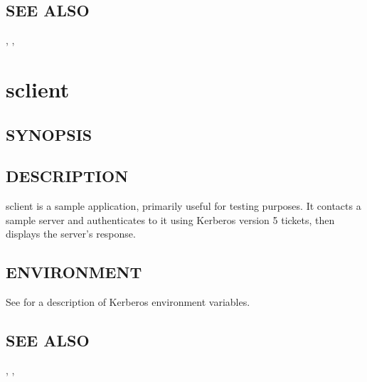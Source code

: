 \documentclass[letterpaper,10pt,english]{sphinxmanual}
\begin{document}
\subsection{SEE ALSO}
\label{\detokenize{user/user_commands/kvno:see-also}}
{\hyperref[\detokenize{user/user_commands/kinit:kinit-1}]{}}, {\hyperref[\detokenize{user/user_commands/kdestroy:kdestroy-1}]{}}, {\hyperref[\detokenize{user/user_config/kerberos:kerberos-7}]{}}


\section{sclient}
\label{\detokenize{user/user_commands/sclient:sclient}}\label{\detokenize{user/user_commands/sclient::doc}}\label{\detokenize{user/user_commands/sclient:sclient-1}}

\subsection{SYNOPSIS}
\label{\detokenize{user/user_commands/sclient:synopsis}}
 


\subsection{DESCRIPTION}
\label{\detokenize{user/user_commands/sclient:description}}
sclient is a sample application, primarily useful for testing
purposes.  It contacts a sample server  and
authenticates to it using Kerberos version 5 tickets, then displays
the server’s response.


\subsection{ENVIRONMENT}
\label{\detokenize{user/user_commands/sclient:environment}}
See {\hyperref[\detokenize{user/user_config/kerberos:kerberos-7}]{}} for a description of Kerberos environment
variables.


\subsection{SEE ALSO}
\label{\detokenize{user/user_commands/sclient:see-also}}
{\hyperref[\detokenize{user/user_commands/kinit:kinit-1}]{}}, , {\hyperref[\detokenize{user/user_config/kerberos:kerberos-7}]{}}



\renewcommand{\indexname}{Index}
\printindex
\end{document}
